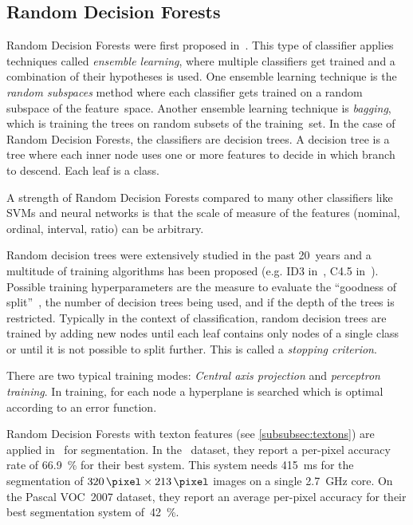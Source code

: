 \subsection{Random Decision Forests}\label{subsec:random-forests}

Random Decision Forests were first proposed in~\cite{ho1995random}. This type
of classifier applies techniques called \textit{ensemble learning}, where
multiple classifiers get trained and a combination of their hypotheses is
used. One ensemble learning technique is the \textit{random subspaces} method
where each classifier gets trained on a random subspace of the feature~space.
Another ensemble learning technique is \textit{bagging}, which is training the
trees on random subsets of the training~set. In the case of Random Decision
Forests, the classifiers are decision trees. A decision tree is a tree where
each inner node uses one or more features to decide in which branch to descend.
Each leaf is a class.

A strength of Random Decision Forests compared to many other classifiers like
\glspl{SVM} and neural networks is that the scale of measure of the features
(nominal, ordinal, interval, ratio) can be arbitrary.

Random decision trees were extensively studied in the past 20~years and a
multitude of training algorithms has been proposed (e.g. ID3
in~\cite{quinlan1986induction}, C4.5 in~\cite{quinlan2014c4}). Possible
training hyperparameters are the measure to evaluate the \enquote{goodness of
split}~\cite{raey89empirical}, the number of decision trees being used, and if
the depth of the trees is restricted. Typically in the context of
classification, random decision trees are trained by adding new nodes until
each leaf contains only nodes of a single class or until it is not possible to
split further. This is called a \textit{stopping criterion}.

There are two typical training modes: \textit{Central axis projection} and
\textit{perceptron training}. In training, for each node a hyperplane is
searched which is optimal according to an error function.

Random Decision Forests with texton features (see \cref{subsubsec:textons}) are
applied in~\cite{shotton2008semantic} for segmentation. In the~\cite{MSCR-db}
dataset, they report a per-pixel accuracy rate of \SI{66.9}{\percent} for their
best system. This system needs \SI{415}{\milli\second} for the segmentation of
$\SI{320}{\pixel} \times \SI{213}{\pixel}$ images on a single
\SI{2.7}{\giga\hertz} core. On the Pascal VOC~2007 dataset, they report an
average per-pixel accuracy for their best segmentation system
of~\SI{42}{\percent}.
